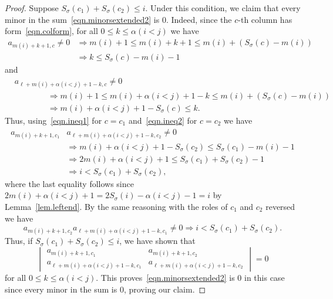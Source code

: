 \documentclass[11pt]{amsart}
\theoremstyle{remark}
\theoremstyle{remark}
\theoremstyle{definition}
\theoremstyle{definition}
\theoremstyle{definition}
\numberwithin{equation}{section}
\newcommand{\gs}{\sigma}
\newcommand{\al}{\alpha}
\newcommand{\mi}[1]{m(#1)}
\begin{document}
\begin{proof}
Suppose $S_\gs(c_1)+S_\gs(c_2)\leq i$. Under this condition, we claim that every minor in the sum~\eqref{eqn.minorsextended2} is $0$. Indeed, since the $c$-th column has form~\eqref{eqn.colform}, for all $0\leq k \leq \al(i<j)$ we have 
\begin{align}\label{eqn.ineq1}
a_{\mi{i}+k+1, c} \neq 0 & \Rightarrow  \mi{i}+1 \leq \mi{i} +k + 1 \leq \mi{i}+(S_\gs(c)-\mi{i}) \\
\nonumber &\Rightarrow k \leq S_\gs(c)-\mi{i}  -1
\end{align}
and 
\begin{align} \label{eqn.ineq2}
&a_{\ell+\mi{i}+\al(i<j) +1 - k, c} \neq 0 \\
\nonumber  & \qquad \qquad \Rightarrow  \mi{i}+1  \leq  \mi{i} + \alpha(i<j)+1 - k \leq  \mi{i} + (S_\gs(c)-\mi{i}) \\
\nonumber & \qquad \qquad \Rightarrow  \mi{i}+ \al(i<j) +1 - S_\gs(c) \leq k.
\end{align}
Thus, using~\eqref{eqn.ineq1} for $c=c_1$ and~\eqref{eqn.ineq2} for $c=c_2$ we have
\begin{align*}
a_{\mi{i}+k+1, c_1}&a_{\ell+\mi{i}+\al(i<j) +1 - k, c_2} \neq 0 \\ &\Rightarrow   \mi{i}+ \al(i<j) +1 - S_\gs(c_2)  \leq S_\gs(c_1)-\mi{i}  -1 \\
&\Rightarrow  2\mi{i} +\al (i<j) +1 \leq S_\gs(c_1)+S_\gs(c_2) -1 \\
&\Rightarrow i  < S_\gs(c_1)+S_\gs(c_2),
\end{align*}
where the last equality follows since $2\mi{i} +\al (i<j) +1 = 2S_\gs(i) -\al(i<j)-1 = i$ by Lemma~\ref{lem.leftend}. By the same reasoning with the roles of $c_1$ and $c_2$ reversed we have 
\[
a_{\mi{i}+k+1, c_2}a_{\ell+\mi{i}+\al(i<j) +1 - k, c_1} \neq 0 \Rightarrow i  < S_\gs(c_1)+S_\gs(c_2).
\]
Thus, if $S_\gs(c_1)+S_\gs(c_2)\leq i$, we have shown that  
\[
\begin{vmatrix} a_{\mi{i}+k+1, c_1} & a_{\mi{i}+k+1, c_2}\\ a_{\ell+\mi{i}+\al(i<j) +1 - k, c_1} & a_{\ell+\mi{i}+\al(i<j) +1 - k, c_2}  \end{vmatrix} =0
\]
for all $0\leq k \leq \al(i<j)$. This proves~\eqref{eqn.minorsextended2} is $0$ in this case since every minor in the sum is $0$, proving our claim. 







\end{proof}
\end{document}
